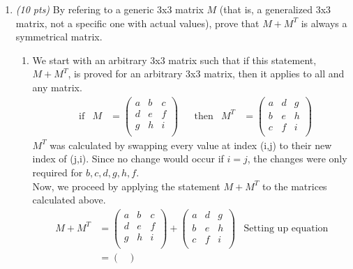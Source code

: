 \documentclass[11pt]{article}
\begin{document}
\begin{enumerate}
\newpage
\medskip
\item
\textit{(10 pts)} 
By refering to a generic 3x3 matrix $M$ (that is, a generalized 3x3 matrix, not a specific one with actual values), prove that $M + M^T$ is always a symmetrical matrix.
\begin{enumerate}
    \item We start with an arbitrary 3x3 matrix such that if this statement, $M + M^T$, is proved for an arbitrary 3x3 matrix, then it applies to all and any matrix.
    \begin{align*}
        &  \text{if} & 
        M &= 
        \begin{pmatrix}
            a & b & c \\
            d & e & f \\
            g & h & i \\
        \end{pmatrix}
        &  & \text{then}
        & M^T &= 
        \begin{pmatrix}
            a & d & g \\
            b & e & h \\
            c & f & i \\
        \end{pmatrix}
    \end{align*}
    $M^T$ was calculated by swapping every value at index (i,j) to their new index of (j,i). Since no change would occur if $i = j$, the changes were only required for $b,c,d,g,h,f$.\\
    Now, we proceed by applying the statement $M + M^T$ to the matrices calculated above. \\
    \begin{align*}
        M + M^T &= 
        \begin{pmatrix}
            a & b & c \\
            d & e & f \\
            g & h & i \\
        \end{pmatrix}
        + 
        \begin{pmatrix}
            a & d & g \\
            b & e & h \\
            c & f & i \\
        \end{pmatrix}
        & \text{Setting up equation} \\
        &= 
        \begin{pmatrix}

\end{pmatrix}
\end{align*}
\end{enumerate}
\end{enumerate}
\end{document}
